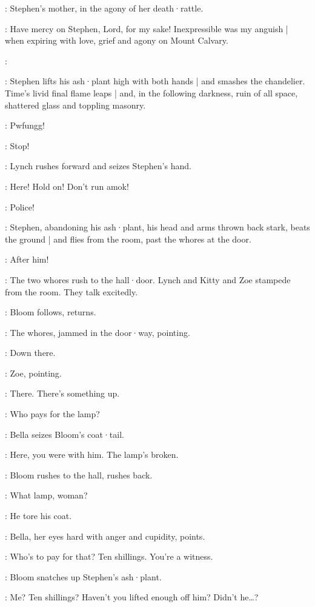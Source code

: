 :
Stephen's mother,
in the agony of her death·rattle.

\Mother:
Have mercy on Stephen,
Lord,
for my sake!
Inexpressible was my anguish |
when expiring with love,
grief and agony
%
on Mount Calvary.

\Stephen:

:
Stephen lifts his ash·plant high with both hands |
and smashes the chandelier.
Time's livid final flame leaps |
and,
in the following darkness,
ruin of all space,
shattered glass and toppling masonry.

\Gasjet[6b]:
Pwfungg!

\Bloom:
Stop!

:
Lynch rushes forward and seizes Stephen's hand.

\Lynch:
Here!
Hold on!
Don't run amok!

\Bella:
Police!

:
Stephen,
abandoning his ash·plant,
his head and arms thrown back stark,
beats the ground |
and flies from the room,
past the whores at the door.

\Bella:
After him!

:
The two whores rush to the hall·door.
%
Lynch and Kitty and Zoe stampede from the room.
They talk excitedly.

:
Bloom follows,
returns.

:
The whores,
jammed in the door·way,
pointing.

\Whores:
Down there.

:
Zoe,
pointing.

\Zoe:
There.
There's something up.

\Bella:
Who pays for the lamp?

:
Bella seizes Bloom's coat·tail.

\Bella:
Here,
you were with him.
The lamp's broken.

:
Bloom rushes to the hall,
rushes back.

\Bloom:
What lamp,
woman?

\Kitty:
He tore his coat.

:
Bella,
her eyes hard with anger and cupidity,
points.

\Bella:
Who's to pay for that?
Ten shillings.
You're a witness.

:
Bloom snatches up Stephen's ash·plant.

\Bloom:
Me?
Ten shillings?
Haven't you lifted enough off him?
Didn't he…?

